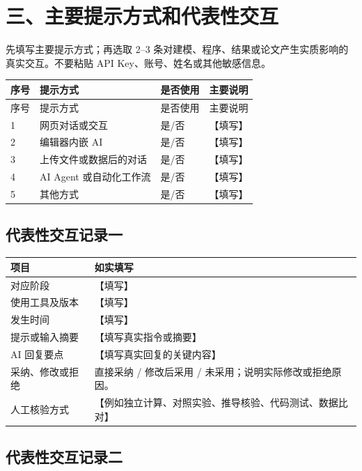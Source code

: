 \documentclass[UTF8,a4paper,11pt]{ctexart}
\begin{document}
\section*{三、主要提示方式和代表性交互}

先填写主要提示方式；再选取 2--3 条对建模、程序、结果或论文产生实质影响的真实交互。不要粘贴 API Key、账号、姓名或其他敏感信息。

\begin{longtable}{p{0.6cm}p{3.3cm}p{1.1cm}p{9.7cm}}
  \toprule
  序号 & 提示方式 & 是否使用 & 主要说明 \\
  \midrule
  \endfirsthead
  \toprule
  序号 & 提示方式 & 是否使用 & 主要说明 \\
  \midrule
  \endhead
  1 & 网页对话或交互 & 是/否 & 【填写】 \\
  2 & 编辑器内嵌 AI & 是/否 & 【填写】 \\
  3 & 上传文件或数据后的对话 & 是/否 & 【填写】 \\
  4 & AI Agent 或自动化工作流 & 是/否 & 【填写】 \\
  5 & 其他方式 & 是/否 & 【填写】 \\
  \bottomrule
\end{longtable}

\subsection*{代表性交互记录一}

\begin{longtable}{p{3.3cm}p{12.6cm}}
  \toprule
  项目 & 如实填写 \\
  \midrule
  对应阶段 & 【填写】 \\
  使用工具及版本 & 【填写】 \\
  发生时间 & 【填写】 \\
  提示或输入摘要 & 【填写真实指令或摘要】 \\
  AI 回复要点 & 【填写真实回复的关键内容】 \\
  采纳、修改或拒绝 & 直接采纳 / 修改后采用 / 未采用；说明实际修改或拒绝原因。 \\
  人工核验方式 & 【例如独立计算、对照实验、推导核验、代码测试、数据比对】 \\
  \bottomrule
\end{longtable}

\subsection*{代表性交互记录二}
\end{document}
